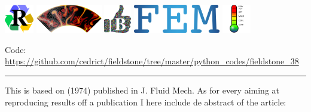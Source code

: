 \includegraphics[height=1.25cm]{images/pictograms/replication}
\includegraphics[height=1.25cm]{images/pictograms/aspect_logo}
\includegraphics[height=1.25cm]{images/pictograms/benchmark}
\includegraphics[height=1.25cm]{images/pictograms/FEM}
\includegraphics[height=1.25cm]{images/pictograms/temperature}


%

\begin{center}
\inpython
{\small Code: \url{https://github.com/cedrict/fieldstone/tree/master/python_codes/fieldstone_38}}
\end{center}

\par\noindent\rule{\textwidth}{0.4pt}


This \stone is based on \textcite{mcrw74} (1974) published in J. Fluid Mech.
As for every \stone aiming at reproducing results off a publication I here include de abstract
of the article:


